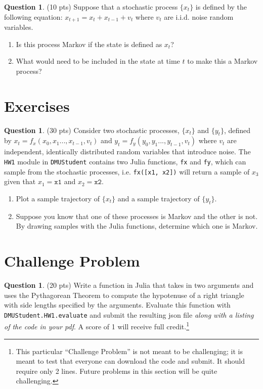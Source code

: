 \documentclass{article}
\theoremstyle{definition}
\newtheorem{question}[thm]{Question}
\begin{document}
\begin{question} (10 pts)
    Suppose that a stochastic process $\{x_t\}$ is defined by the following equation: $x_{t+1} = x_t + x_{t-1} + v_{t}$ where $v_t$ are i.i.d. noise random variables.
    \begin{enumerate}[label=(\alph*)]
        \item Is this process Markov if the state is defined as $x_t$?
        \item What would need to be included in the state at time $t$ to make this a Markov process?
    \end{enumerate}
\end{question}

\section{Exercises}

\begin{question} (30 pts)
    Consider two stochastic processes, $\{x_t\}$ and $\{y_t\}$, defined by $x_t = f_x(x_{0}, x_{1}... , x_{t-1}, v_t)$ and $y_t = f_y(y_{0}, y_{1}... , y_{t-1}, v_t)$ where $v_t$ are independent, identically distributed random variables that introduce noise. The \texttt{HW1} module in \texttt{DMUStudent} contains two Julia functions, \texttt{fx} and \texttt{fy}, which can sample from the stochastic processes, i.e. \texttt{fx([x1, x2])} will return a sample of $x_3$ given that $x_1 = \texttt{x1}$ and $x_2 = \texttt{x2}$.

    \begin{enumerate}[label=\alph*)]
        \item Plot a sample trajectory of $\{x_t\}$ and a sample trajectory of $\{y_t\}$.
        \item Suppose you know that one of these processes is Markov and the other is not. By drawing samples with the Julia functions, determine which one is Markov.
    \end{enumerate}
\end{question}

\section{Challenge Problem}

\begin{question} (20 pts)
    Write a function in Julia that takes in two arguments and uses the Pythagorean Theorem to compute the hypotenuse of a right triangle with side lengths specified by the arguments. Evaluate this function with \texttt{DMUStudent.HW1.evaluate} and submit the resulting json file \textit{along with a listing of the code in your pdf}. A score of 1 will receive full credit.\footnote{This particular ``Challenge Problem'' is not meant to be challenging; it is meant to test that everyone can download the code and submit. It should require only 2 lines. Future problems in this section will be quite challenging.}
\end{question}
\end{document}
